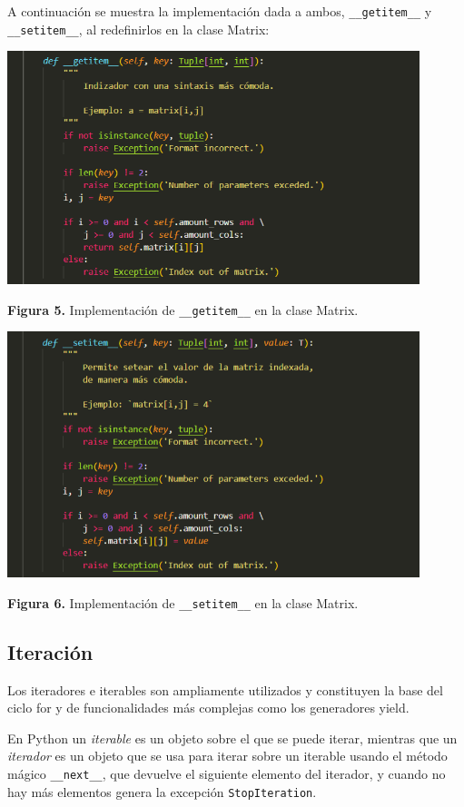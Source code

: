 \documentclass[10pt]{article} %
\newcommand{\csl}[1]{\colorbox{backcolour}{\texttt{#1}}}
\newcommand{\imgcaption}[2]{\tiny \textbf{Figura #1.} #2.}
\newcommand{\mgc}[2][]{\colorbox{backcolour}{\texttt{\_\_#2\_\_#1}}}
\newcommand{\mgccapt}[1]{\texttt{\_\_#1\_\_}}
\begin{document}
A continuaci\'on se muestra la implementaci\'on dada a ambos, 
\mgc{getitem} y \mgc{setitem}, al redefinirlos en la clase Matrix:

\begin{center}
	\includegraphics[width=12cm]{getitem.png}
	
	\imgcaption{5}{Implementaci\'on de \mgccapt{getitem} en la clase Matrix}
\end{center}

\begin{center}
	\includegraphics[width=12cm]{setitem.png}
	
	\imgcaption{6}{Implementaci\'on de \mgccapt{setitem} en la clase Matrix}
\end{center}

\subsection{Iteraci\'on}

Los iteradores e iterables son ampliamente utilizados y constituyen la base del ciclo for y de funcionalidades más complejas como los generadores yield.

En Python un \textit{iterable} es un objeto sobre el que se puede iterar, mientras que un \textit{iterador} es un objeto que se usa para iterar sobre un iterable usando el método m\'agico \mgc{next}, que devuelve el siguiente elemento del iterador, y cuando no hay m\'as elementos genera la excepción \csl{StopIteration}.
\end{document}
